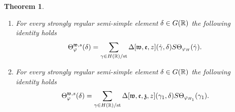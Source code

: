 \documentclass{article}
\newtheorem{thm}{Theorem}[subsection]
\theoremstyle{definition}
\numberwithin{equation}{section}
\renewcommand{\-}{\hyp{}}
\begin{document}
\begin{thm} \label{thm:main2}
\begin{enumerate}
	\item For every strongly regular semi-simple element $\delta \in G(\mathbb{R})$ the following identity holds
	\[ \Theta_\varphi^{\mathfrak{w},s}(\delta) = \sum_{\gamma \in H(\mathbb{R})/\textrm{st}} \Delta[\mathfrak{w},\mathfrak{e},z](\dot\gamma,\delta)S\Theta_{\varphi_H}(\dot\gamma). \]
	\item For every strongly regular semi-simple element $\delta \in G(\mathbb{R})$ the following identity holds
	\[ \Theta_\varphi^{\mathfrak{w},s}(\delta) = \sum_{\gamma \in H(\mathbb{R})/\textrm{st}} \Delta[\mathfrak{w},\mathfrak{e},\mathfrak{z},z](\gamma_1,\delta)S\Theta_{\varphi_{H_1}}(\gamma_1). \]
\end{enumerate}
\end{thm}
\end{document}

